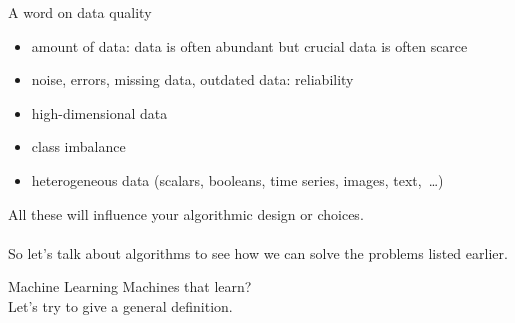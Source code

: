 \documentclass{beamer}
\begin{document}
\begin{frame}{A word on data quality}
\begin{itemize}
\item amount of data: data is often abundant but crucial data is often scarce
\item noise, errors, missing data, outdated data: reliability
\item high-dimensional data
\item class imbalance
\item heterogeneous data (scalars, booleans, time series, images, text, \ldots)
\end{itemize}
All these will influence your algorithmic design or choices.\\
~\\
So let's talk about algorithms to see how we can solve the problems listed earlier.
\end{frame}

\begin{frame}{Machine Learning}
\centering
Machines that learn?\\
Let's try to give a general definition.\\
~\\
\end{frame}
\end{document}
